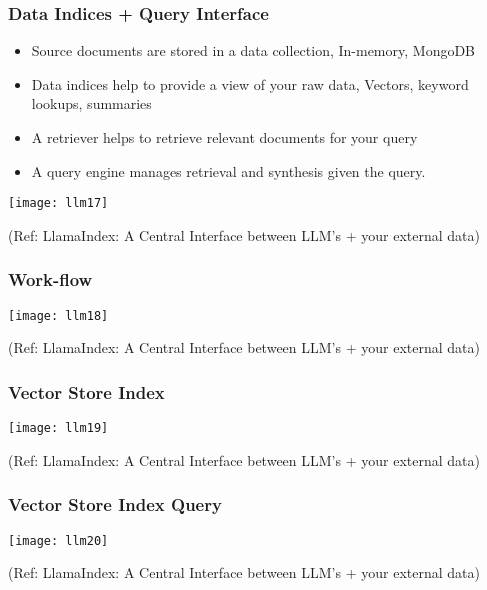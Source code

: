 \begin{frame}[fragile]\frametitle{Data Indices + Query Interface}


\begin{itemize}
\item Source documents are stored in a data collection, In-memory, MongoDB
\item Data indices help to provide a view of your raw data, Vectors, keyword lookups, summaries
\item A retriever helps to retrieve relevant documents for your query
\item A query engine manages retrieval and synthesis given the query. 
\end{itemize}	

\begin{center}
\texttt{[image: llm17]}

{\tiny (Ref: LlamaIndex: A Central Interface between LLM's + your external data)}
\end{center}

\end{frame}

\begin{frame}[fragile]\frametitle{Work-flow}

\begin{center}
\texttt{[image: llm18]}

{\tiny (Ref: LlamaIndex: A Central Interface between LLM's + your external data)}
\end{center}
\end{frame}

\begin{frame}[fragile]\frametitle{Vector Store Index}

\begin{center}
\texttt{[image: llm19]}

{\tiny (Ref: LlamaIndex: A Central Interface between LLM's + your external data)}
\end{center}
\end{frame}

\begin{frame}[fragile]\frametitle{Vector Store Index Query}

\begin{center}
\texttt{[image: llm20]}

{\tiny (Ref: LlamaIndex: A Central Interface between LLM's + your external data)}
\end{center}
\end{frame}

